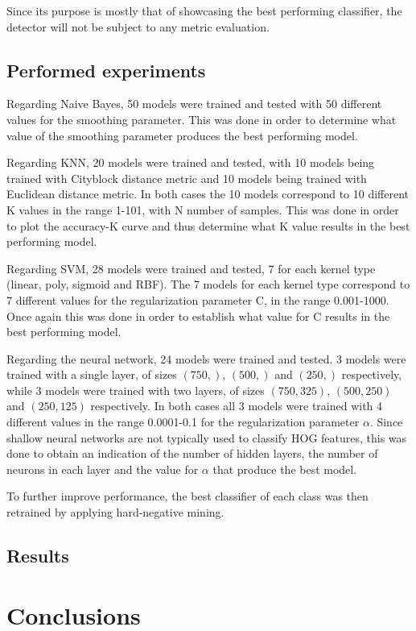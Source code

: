\documentclass[journal,twocolumn]{IEEEtran}
\begin{document}
Since its purpose is mostly that of showcasing the best performing classifier, the detector will not be subject to any metric evaluation.

\subsection{Performed experiments}

Regarding Naive Bayes, 50 models were trained and tested with 50 different values for the smoothing parameter. This was done in order to determine what value of the smoothing parameter produces the best performing model.

Regarding KNN, 20 models were trained and tested, with 10 models being trained with Cityblock distance metric and 10 models being trained with Euclidean distance metric. In both cases the 10 models correspond to 10 different K values in the range 1-101, with N number of samples. This was done in order to plot the accuracy-K curve and thus determine what K value results in the best performing model.

Regarding SVM, 28 models were trained and tested, 7 for each kernel type (linear, poly, sigmoid and RBF). The 7 models for each kernel type correspond to 7 different values for the regularization parameter C, in the range 0.001-1000. Once again this was done in order to establish what value for C results in the best performing model.

Regarding the neural network, 24 models were trained and tested. 3 models were trained with a single layer, of sizes $(750,)$, $(500,)$ and $(250,)$ respectively, while 3 models were trained with two layers, of sizes $(750,325)$, $(500,250)$ and $(250,125)$ respectively. In both cases all 3 models were trained with 4 different values in the range 0.0001-0.1 for the regularization parameter $\alpha$. Since shallow neural networks are not typically used to classify HOG features, this was done to obtain an indication of the number of hidden layers, the number of neurons in each layer and the value for $\alpha$ that produce the best model.

To further improve performance, the best classifier of each class was then retrained by applying hard-negative mining.

\subsection{Results}


\section{Conclusions}
\label{sec:conc}

\printbibliography
\end{document}

